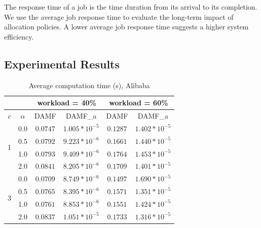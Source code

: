 The response time of a job is the time duration from its arrival to its completion. We use the average job response time to evaluate the long-term impact of allocation policies. A lower average job response time suggests a higher system efficiency. 

\subsection{Experimental Results}

\begin{table}[t]
  \caption{Average computation time (s), Alibaba}
  \label{tab:computation_time_ali}
  \centering
    \begin{tabularx}{0.65\textwidth}{cccccc}
      \toprule
      & & \multicolumn{2}{c}{workload = 40\%} & \multicolumn{2}{c}{workload = 60\%} \\
      \midrule
      $c$ & $\alpha$ & DAMF & DAMF\_a & DAMF & DAMF\_a \\
      \midrule
      \multirow{4}{*}{1} 
      & 0.0 & $0.0747$ & $1.005*10^{-5}$ &  $0.1287$ & $1.402*10^{-5}$\\
      & 0.5 & $0.0792$ & $9.223*10^{-6}$&  $0.1661$ & $1.440*10^{-5}$\\
      & 1.0 & $0.0793$ & $9.409*10^{-6}$&  $0.1764$ & $1.453*10^{-5}$\\
      & 2.0 & $0.0841$ & $8.205*10^{-6}$&  $0.1709$ & $1.401*10^{-5}$\\
      \midrule
      \multirow{4}{*}{3} 
      & 0.0 & $0.0709$ & $8.749*10^{-6}$&  $0.1497$ & $1.690*10^{-5}$ \\
      & 0.5 & $0.0765$ & $8.395*10^{-6}$& $0.1571$ & $1.351*10^{-5}$ \\
      & 1.0 & $0.0761$ & $8.853*10^{-6}$& $0.1551$ & $1.424*10^{-5}$ \\
      & 2.0 & $0.0837$ & $1.051*10^{-5}$& $0.1733$ & $1.316*10^{-5}$ \\
      \bottomrule
    \end{tabularx}
\end{table}

